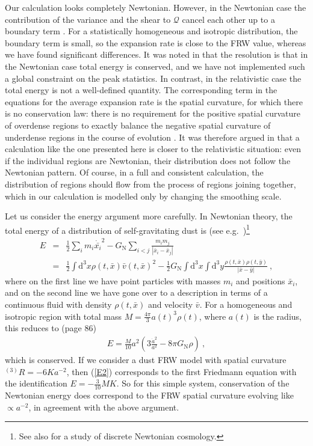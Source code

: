 \documentclass[11pt, a4paper]{article}
\newcommand{\bea}{\begin{eqnarray}} \newcommand{\eea}{\end{eqnarray}}
\newcommand{\el}{\nonumber \\}
\newcommand{\re}[1]{(\ref{#1})}
\newcommand{\GN}{G_{\mathrm{N}}}
\newcommand{\rmd}{\mathrm{d}}
\newcommand{\eg}{e.g.\ }
\newcommand{\adot}{\dot{a}}
\newcommand{\sQ}{\mathcal{Q}}
\newcommand{\sR}{{^{(3)}R}}
\begin{document}
Our calculation looks completely Newtonian. However, in the Newtonian case the contribution of the variance and the shear to $\sQ$ cancel each other up to a boundary term \cite{Buchert:1995fz}. For a statistically homogeneous and isotropic distribution, the boundary term is small, so the expansion rate is close to the FRW value, whereas we have found significant differences. It was noted in \cite{Rasanen:2008it} that the resolution is that in the Newtonian case total energy is conserved, and we have not implemented such a global constraint on the peak statistics.
In contrast, in the relativistic case the total energy is not a well-defined quantity. The corresponding term in the equations for the average expansion rate is the spatial curvature, for which there is no conservation law: there is no requirement for the positive spatial curvature of overdense regions to exactly balance the negative spatial curvature of underdense regions in the course of evolution \cite{Buchert:2011sx, Buchert:2017obp}.
It was therefore argued in \cite{Rasanen:2008it} that a calculation like the one presented here is closer to the relativistic situation: even if the individual regions are Newtonian, their distribution does not follow the Newtonian pattern. Of course, in a full and consistent calculation, the distribution of regions should flow from the process of regions joining together, which in our calculation is modelled only by changing the smoothing scale.

Let us consider the energy argument more carefully. In Newtonian theory, the total energy of a distribution of self-gravitating dust is (see \eg \cite{Bond:1996})\footnote{See also \cite{Gibbons:2013msa} for a study of discrete Newtonian cosmology.}
\bea \label{E}
  E &=& \frac{1}{2} \sum_i m_i \dot{\bar{x_i}}^2 - \GN \sum_{i<j} \frac{m_i m_j}{|\bar{x}_i-\bar{x}_j|} \el
  &=& \frac{1}{2} \int\rmd^3 x \rho(t,\bar x) \bar{v}(t,\bar{x})^2 - \frac{1}{2} \GN \int\rmd^3 x \int\rmd^3 y \frac{\rho(t,\bar x) \rho(t,\bar y)}{|\bar{x}-\bar{y}|} \ ,
\eea
%
where on the first line we have point particles with masses $m_i$ and positions $\bar x_i$, and on the second line we have gone over to a description in terms of a continuous fluid with density $\rho(t,\bar x)$ and velocity $\bar v$. For a homogeneous and isotropic region with total mass $M=\frac{4\pi}{3}a(t)^3\rho(t)$, where $a(t)$ is the radius, this reduces to \cite{Peebles:1980} (page 86)
\bea \label{E2}
  E = \frac{M}{10} a^2 \left( 3 \frac{\adot^2}{a^2} - 8\pi\GN\rho \right) \ ,
\eea
%
which is conserved. If we consider a dust FRW model with spatial curvature $\sR=-6 K a^{-2}$, then \re{E2} corresponds to the first Friedmann equation with the identification $E=-\frac{3}{10} M K$. So for this simple system, conservation of the Newtonian energy does correspond to the FRW spatial curvature evolving like $\propto a^{-2}$, in agreement with the above argument.
\end{document}
